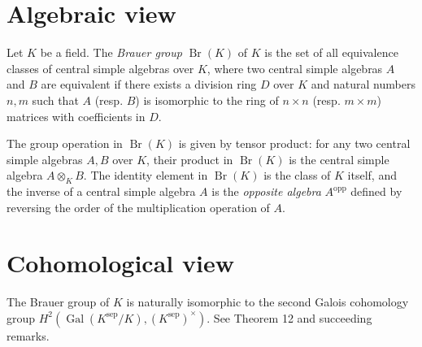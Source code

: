 \documentclass[12pt]{article}
\begin{document}
\section{Algebraic view}

Let $K$ be a field. The {\em Brauer group} $\operatorname{Br}(K)$ of $K$ is the set of all equivalence classes of central simple algebras over $K$, where two central simple algebras $A$ and $B$ are equivalent if there exists a division ring $D$ over $K$ and natural numbers $n,m$ such that $A$ (resp. $B$) is isomorphic to the ring of $n \times n$ (resp. $m \times m$) matrices with coefficients in $D$.

The group operation in $\operatorname{Br}(K)$ is given by tensor product: for any two central simple algebras $A,B$ over $K$, their
product in $\operatorname{Br}(K)$ is the central simple algebra $A \otimes_K B$. The identity element in $\operatorname{Br}(K)$ is the class of $K$ itself, and the inverse of a central simple algebra $A$ is
the {\em opposite algebra} $A^{\operatorname{opp}}$ defined by reversing
the order of the multiplication operation of $A$.

\section{Cohomological view}

The Brauer group of $K$ is naturally isomorphic to the second Galois cohomology group 
$H^2({\operatorname{Gal}}(K^{\operatorname{sep}}/K),
(K^{\operatorname{sep}})^{\times})$.
See  Theorem 12 and succeeding remarks.
\end{document}
